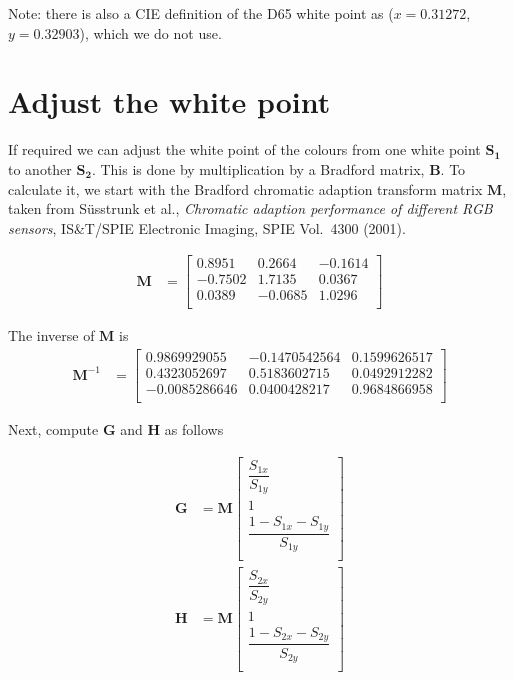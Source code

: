 \documentclass{article}
\begin{document}
Note: there is also a CIE definition of the D65 white point as ($x =
0.31272$, $y = 0.32903$), which we do not use.


\section{Adjust the white point}

If required we can adjust the white point of the colours from one
white point $\mathbf{S_1}$ to another $\mathbf{S_2}$.  This is done by multiplication by
a Bradford matrix, $\mathbf{B}$.  To calculate it, we start with the
Bradford chromatic adaption transform matrix $\mathbf{M}$, taken from
S\"usstrunk et al., \textit{Chromatic adaption performance of
  different RGB sensors}, IS\&T/SPIE Electronic Imaging, SPIE
Vol.\ 4300 (2001).

\begin{align}
\mathbf{M} &= \left[\begin{matrix}
0.8951 & 0.2664 & -0.1614 \\
-0.7502 & 1.7135 & 0.0367 \\
0.0389 & -0.0685 & 1.0296 \\
\end{matrix}\right]
\end{align}

The inverse of $\mathbf{M}$ is
\begin{align}
\mathbf{M}^{-1} &= \left[\begin{matrix}
0.9869929055 & -0.1470542564 & 0.1599626517 \\
0.4323052697 & 0.5183602715 & 0.0492912282 \\
-0.0085286646 & 0.0400428217 & 0.9684866958 \\
\end{matrix}\right]
\end{align}

Next, compute $\mathbf{G}$ and $\mathbf{H}$ as follows

\begin{align}
\mathbf{G} &= \mathbf{M} \left[\begin{matrix} \dfrac{S_{1x}}{S_{1y}} \\[2ex] 1 \\ \dfrac{1 - S_{1x} - S_{1y}}{S_{1y}} \\[2ex] \end{matrix}\right] \\
\mathbf{H} &= \mathbf{M} \left[\begin{matrix} \dfrac{S_{2x}}{S_{2y}} \\[2ex] 1 \\ \dfrac{1 - S_{2x} - S_{2y}}{S_{2y}} \\[2ex] \end{matrix}\right]
\end{align}
\end{document}
